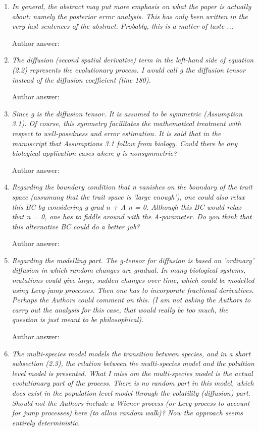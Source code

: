 \documentclass[a4paper,11pt]{scrartcl}
\begin{document}
\begin{enumerate}
\item
\textit{In general, the abstract may put more emphasis on what the paper is actually about: namely the posterior error analysis. This has only been written in the very last sentences of the abstract. Probably, this is a matter of taste ...}

Author answer:

\item
\textit{The diffusion (second spatial derivative) term in the left-hand side of equation (2.2) represents the evolutionary process. I would call g the diffusion tensor instead of the diffusion coefficient (line 180).}

Author answer:

\item
\textit{Since g is the diffusion tensor. It is assumed to be symmetric (Assumption 3.1). Of course, this symmetry facilitates the mathematical treatment with respect to well-posedness and error estimation. It is said that in the manuscript that Assumptions 3.1 follow from biology. Could there be any biological application cases where g is nonsymmetric?}

Author answer:

\item
\textit{Regarding the boundary condition that n vanishes on the boundary of the trait space (assumung that the trait space is 'large enough'), one could also relax this BC by considering g grad n + A n = 0. Although this BC would relax that n = 0, one has to fiddle around with the A-parameter. Do you think that this alternative BC could do a better job?}

Author answer:

\item
\textit{Regarding the modelling part. The g-tensor for diffusion is based on 'ordinary' diffusion in which random changes are gradual. In many biological systems, mutations could give large, sudden changes over time, which could be modelled using Levy-jump processes. Then one has to incorporate fractional derivatives. Perhaps the Authors could comment on this. (I am not asking the Authors to carry out the analysis for this case, that would really be too much, the question is just meant to be philosophical).}

Author answer:

\item
\textit{The multi-species model models the transition between species, and in a short subsection (2.3), the relation between the multi-species model and the polultion level model is presented. What I miss om the multi-species model is the actual evolutionary part of the process. There is no random part in this model, which does exist in the population level model through the volatility (diffusion) part. Should not the Authors include a Wiener process (or Levy process to account for jump processes) here (to allow random walk)? Now the approach seems entirely deterministic.}


\end{enumerate}
\end{document}
